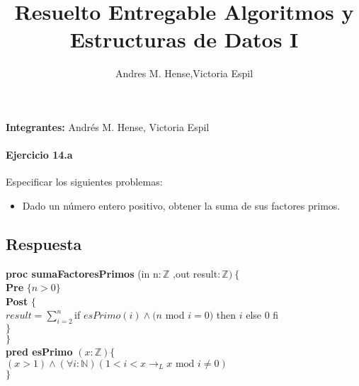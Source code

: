 \documentclass[a4paper]{article}
\title{Resuelto Entregable Algoritmos y Estructuras de Datos I}
\author{Andres M. Hense,Victoria Espil}
\date{} %
\begin{document}




\begin{center}
\textbf{Integrantes:} Andrés M. Hense, Victoria Espil
\end{center}

\paragraph*{Ejercicio 14.a} Especificar los siguientes problemas:
	\begin{itemize}
		\item Dado un número entero positivo, obtener la suma de sus factores primos.
	\end{itemize}
	
\subsection*{Respuesta}

			\textbf{proc sumaFactoresPrimos }(in n$:\mathbb{Z}$
				,out result$: \mathbb{Z} )\ \{$\smallskip \\
			\hspace*{6mm} \textbf{Pre }$\{n>0 \}$\smallskip \\
			\hspace*{6mm} \textbf{Post }$\{$\\
			\hspace*{6mm} $result=\sum_{i=2}^{n}$if $esPrimo(i)\wedge(n$ mod $i=0)$ then $i$ else 0 fi\\
			\hspace*{6mm} $\}$\\
			\hspace*{5mm}$\}$\smallskip \\
			
			\textbf{pred esPrimo} $(x: \mathbb{Z})\{$\\ 
			\hspace*{6mm}$ (x > 1)\wedge(\forall i :\mathbb{N})
			(1<i<x \rightarrow _L x\textrm{ mod }i\neq 0 )$\\
			\hspace*{5mm}$\}$\smallskip \\
			
\end{document}

